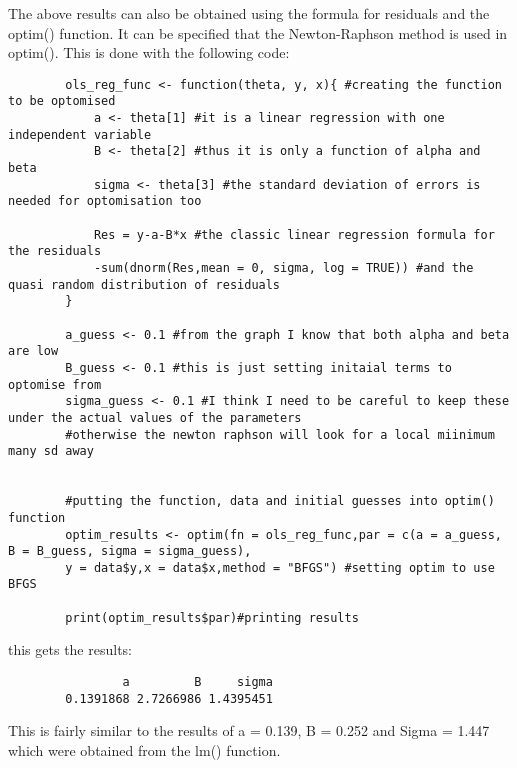 \documentclass{article}
\begin{document}
	The above results can also be obtained using the formula for residuals and the optim() function. It can be specified that the Newton-Raphson method is used in optim(). This is done with the following code:
	\begin{verbatim}
		ols_reg_func <- function(theta, y, x){ #creating the function to be optomised
			a <- theta[1] #it is a linear regression with one independent variable
			B <- theta[2] #thus it is only a function of alpha and beta
			sigma <- theta[3] #the standard deviation of errors is needed for optomisation too
			
			Res = y-a-B*x #the classic linear regression formula for the residuals
			-sum(dnorm(Res,mean = 0, sigma, log = TRUE)) #and the quasi random distribution of residuals
		}
		
		a_guess <- 0.1 #from the graph I know that both alpha and beta are low
		B_guess <- 0.1 #this is just setting initaial terms to optomise from
		sigma_guess <- 0.1 #I think I need to be careful to keep these under the actual values of the parameters
		#otherwise the newton raphson will look for a local miinimum many sd away
		
		
		#putting the function, data and initial guesses into optim() function
		optim_results <- optim(fn = ols_reg_func,par = c(a = a_guess, B = B_guess, sigma = sigma_guess), 
		y = data$y,x = data$x,method = "BFGS") #setting optim to use BFGS
		
		print(optim_results$par)#printing results
	\end{verbatim}
	this gets the results:
	\begin{verbatim}
		        a         B     sigma 
		0.1391868 2.7266986 1.4395451 
	\end{verbatim}
This is fairly similar to the results of a = 0.139, B = 0.252 and Sigma = 1.447 which were obtained from the lm() function.















	
\end{document}
